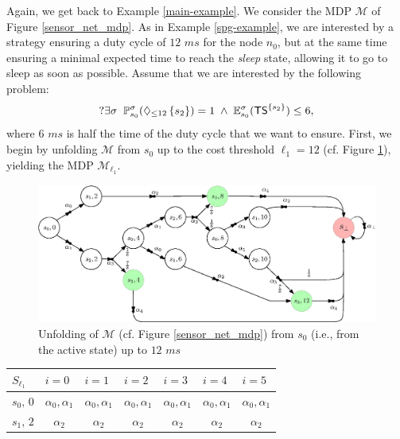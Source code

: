 \begin{example}\label{sspwe-example}
  Again, we get back to Example \ref{main-example}.
  We consider the MDP $\mathcal{M}$ of Figure \ref{sensor_net_mdp}. As in Example \ref{spg-example}, we are interested by a strategy ensuring a duty cycle of $12$ $ms$ for the node $n_0$, but at the same time ensuring a minimal expected time to reach the \textit{sleep} state, allowing it to go to sleep as soon as possible.
  Assume that we are interested by the following \SSPWE{} problem:
  \[
    ?\exists \sigma \; \;  \mathbb{P}^\sigma_{s_0}(\Diamond_{\leq 12} \, \{s_2\}) = 1 \; \wedge \; \mathbb{E}^\sigma_{s_0}(\text{\sffamily TS}^{\{s_2\}}) \leq 6,
  \]
  where $6$ $ms$ is half the time of the duty cycle that we want to ensure. First, we begin by unfolding $\mathcal{M}$ from $s_0$ up to the cost threshold $\ell_1 = 12$ (cf. Figure \ref{unfolding-sspwe}), yielding the MDP $\mathcal{M}_{\ell_1}$.
  \begin{figure}[h]
    \centering
    \includegraphics[width=0.9\linewidth]{resources/main-example-unfolding}
    \captionsetup{justification=centering}
    \caption{Unfolding of $\mathcal{M}$ (cf. Figure \ref{sensor_net_mdp}) from $s_0$ (i.e., from the active state) up to $12$ $ms$}
    \label{unfolding-sspwe}
  \end{figure}
  \begin{table}[h]
  \centering
\begin{tabular}{l|cccccc}
$S_{\ell_1}$          & \multicolumn{1}{l}{$i=0$} & \multicolumn{1}{l}{$i=1$}                                  & \multicolumn{1}{l}{$i=2$}  & \multicolumn{1}{l}{$i=3$}  & \multicolumn{1}{l}{$i=4$} & \multicolumn{1}{l}{$i=5$} \\ \hline
$s_0, \, 0$  & $\alpha_0, \alpha_1$      & $\alpha_0, \alpha_1$                                       & $\alpha_0, \alpha_1$       & $\alpha_0, \alpha_1$       & $\alpha_0, \alpha_1$      & $\alpha_0, \alpha_1$      \\
$s_1, \, 2$  & $\alpha_2$                & $\alpha_2$                                                 & $\alpha_2$                 & $\alpha_2$                 & $\alpha_2$                & $\alpha_2$                \\

\end{tabular}
\end{table}
\end{example}
